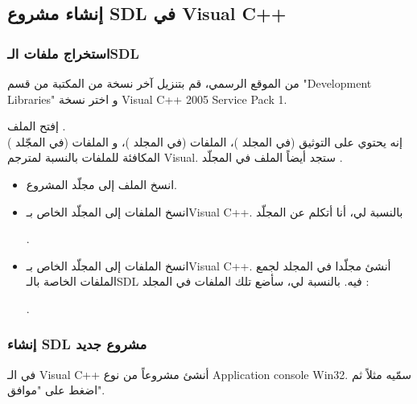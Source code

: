 \subsection{إنشاء مشروع \textenglish{SDL} في \textenglish{Visual C++}}

\subsubsection{استخراج ملفات الـ\textenglish{SDL}}

من الموقع الرسمي، قم بتنزيل آخر نسخة من المكتبة من قسم
"\textenglish{Development Libraries}"
و اختر نسخة
\textenglish{Visual C++ 2005 Service Pack 1}.

إفتح الملف
.\\
إنه يحتوي  على التوثيق (في المجلد
)،
 الملفات
(في المجلد
)، 
و الملفات
(في المجّلد
)
المكافئة للملفات
بالنسبة لمترجم
\textenglish{Visual}.
ستجد أيضاً الملف 
في المجلّد
.

\begin{itemize}
	\item انسخ الملف
	إلى مجلّد المشروع.
	\item انسخ الملفات
	إلى المجلّد 
	الخاص بـ\textenglish{Visual C++}.
	بالنسبة لي، أنا أتكلم عن المجلّد
	
	.
	
	\item انسخ الملفات
	إلى المجلّد
	الخاص بـ\textenglish{Visual C++}.
	أنشئ مجلّدا
	في المجلد
	لجمع الملفات
	الخاصة بالـ\textenglish{SDL}
	فيه. بالنسبة لي، سأضع تلك الملفات في المجلد :
	
	.

\end{itemize}

\subsubsection{إنشاء \textenglish{SDL} مشروع جديد}

في الـ
\textenglish{Visual C++}
أنشئ مشروعاً من نوع 
\textenglish{Application console Win32}.
سمّيه مثلاً
ثم اضغط على "موافق".

